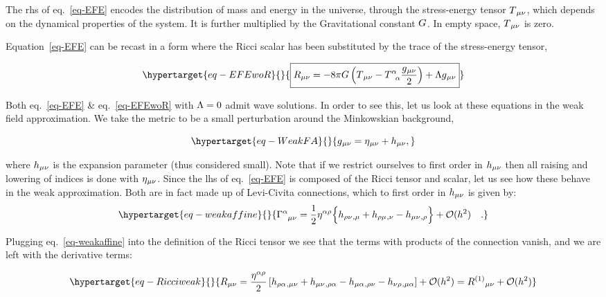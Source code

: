 \documentclass[
  11pt,
  a4paper,
  DIV=11,
  numbers=noendperiod,
  oneside]{scrreprt}
\DeclareRobustCommand{\[}{\begin{equation}}
\DeclareRobustCommand{\]}{\end{equation}}
\begin{document}
The \gls{rhs} of eq.~\ref{eq-EFE} encodes the distribution of mass and
energy in the universe, through the stress-energy tensor \(T{}_{\mu\nu}\),
which depends on the dynamical properties of the system. It is further
multiplied by the Gravitational constant \(G\). In empty space,
\(T{}_{\mu\nu}\) is zero.

Equation~\ref{eq-EFE} can be recast in a form where the Ricci scalar has
been substituted by the trace of the stress-energy tensor,

\begin{equation}\protect\hypertarget{eq-EFEwoR}{}{
\boxed{\RicciTco=-8 \pi \grav\left(\SEco-\trSE \frac{\met}{2}\right)+\cosmo \met} 
}\label{eq-EFEwoR}\end{equation}

Both eq.~\ref{eq-EFE} \& eq.~\ref{eq-EFEwoR} with \(\Lambda=0\) admit
wave solutions. In order to see this, let us look at these equations in
the weak field approximation. We take the metric to be a small
perturbation around the Minkowskian background,

\begin{equation}\protect\hypertarget{eq-WeakFA}{}{
    \met = \mink + \weakmet,
}\label{eq-WeakFA}\end{equation}

where \(h{}_{\mu\nu}\) is the expansion parameter (thus considered small).
Note that if we restrict ourselves to first order in \(h{}_{\mu\nu}\) then
all raising and lowering of indices is done with \(\eta{}_{\mu\nu}\). Since the
\gls{lhs} of eq.~\ref{eq-EFE} is composed of the Ricci tensor and
scalar, let us see how these behave in the weak approximation. Both are
in fact made up of Levi-Civita connections, which to first order in
\(h{}_{\mu\nu}\) is given by:
\begin{equation}\protect\hypertarget{eq-weakaffine}{}{
\LC{\alpha}{\mu}{\nu} = \frac{1}{2} \invmink[\alpha \rho]
\brk[\Big]{
    \ipdv{ \weakmet[\rho \nu]}{\mu}
    +\ipdv{ \weakmet[\rho \mu]}{\nu}
    -\ipdv{ \weakmet}{\rho}} + \order[2]{h}\quad .
}\label{eq-weakaffine}\end{equation}

Plugging eq.~\ref{eq-weakaffine} into the definition of the Ricci tensor
we see that the terms with products of the connection vanish, and we are
left with the derivative terms:

\begin{equation}\protect\hypertarget{eq-Ricciweak}{}{ 
\RicciTco  =
 \frac{\invmink[\alpha\rho]}{2}\left[ \ipdv{\weakmet[\rho\alpha]}{\mu\nu} + \ipdv{\weakmet}{\rho\alpha} - \ipdv{\weakmet[\mu\alpha]}{\rho\nu} - \ipdv{\weakmet[\nu\rho]}{\mu\alpha} \right] + \mathcal{O}(h^2)=\linRicciTco+ \mathcal{O}(h^2)
}\label{eq-Ricciweak}\end{equation}
\end{document}
